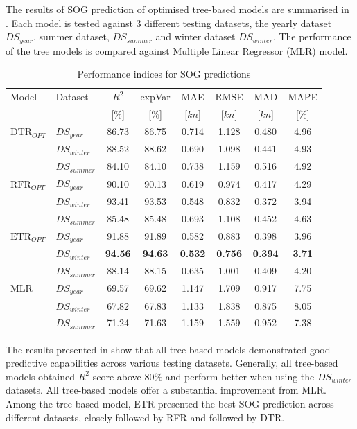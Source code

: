 The results of SOG prediction of optimised tree-based models are summarised in . Each model is tested against 3 different testing datasets, the yearly dataset $DS_{year}$, summer dataset, $DS_{summer}$ and winter dataset $DS_{winter}$. The performance of the tree models is compared against Multiple Linear Regressor (MLR) model.

\begin{table}[ht]
    \footnotesize
    \centering
    {\begin{tabular}{ l l c c c c c c }
    \hline
    Model & Dataset & $R^2$ & expVar & MAE & RMSE & MAD & MAPE \\
    & & [$\%$] & [$\%$] & [$kn$] & [$kn$] & [$kn$] & [$\%$]  \\ 
    \hline
    $\text{DTR}_{OPT}$ & $DS_{year}$ & 86.73 & 86.75 & 0.714 & 1.128  & 0.480 & 4.96  \\
    & $DS_{winter}$ & 88.52 & 88.62 & 0.690 & 1.098 & 0.441 & 4.93 \\
    & $DS_{summer}$ & 84.10 & 84.10 & 0.738 & 1.159 & 0.516 & 4.92 \\
    $\text{RFR}_{OPT}$ & $DS_{year}$  & 90.10 & 90.13 & 0.619 & 0.974 & 0.417 & 4.29 \\
    & $DS_{winter}$ & 93.41 & 93.53 & 0.548 & 0.832 & 0.372 & 3.94 \\
    & $DS_{summer}$ & 85.48 & 85.48 & 0.693 & 1.108 & 0.452 & 4.63 \\
    $\text{ETR}_{OPT}$ & $DS_{year}$ & 91.88 & 91.89 & 0.582 & 0.883 & 0.398 & 3.96 \\
    & $DS_{winter}$ & \textbf{94.56} & \textbf{94.63} & \textbf{0.532} & \textbf{0.756} & \textbf{0.394} & \textbf{3.71} \\
    & $DS_{summer}$ & 88.14 & 88.15 & 0.635 & 1.001 & 0.409 & 4.20 \\
    MLR & $DS_{year}$ & 69.57 & 69.62 & 1.147 & 1.709 & 0.917 & 7.75 \\
    & $DS_{winter}$ & 67.82 & 67.83 & 1.133 & 1.838 & 0.875 & 8.05 \\
    & $DS_{summer}$ & 71.24 & 71.63 & 1.159 & 1.559 & 0.952 & 7.38 \\
    \hline
    \end{tabular}}
\caption{Performance indices for SOG predictions}\label{tbl:testing_dataset_sog_result}
\end{table}

The results presented in  show that all tree-based models demonstrated good predictive capabilities across various testing datasets. Generally, all tree-based models obtained $R^2$ score above $80\%$ and perform better when using the $DS_{winter}$ datasets. All tree-based models offer a substantial improvement from MLR. Among the tree-based model, ETR presented the best SOG prediction across different datasets, closely followed by RFR and followed by DTR.\\ 

